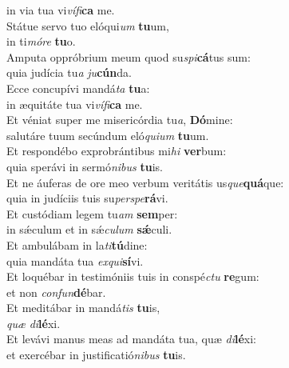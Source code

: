 \oddverse in via tua vi\textit{ví}\textit{fi}\textbf{ca} me.\\
\evenverse Státue servo tuo elóqui\textit{um} \textbf{tu}um,~\*\\
\evenverse in ti\textit{mó}\textit{re} \textbf{tu}o.\\
\oddverse Amputa oppróbrium meum quod su\textit{spi}\textbf{cá}tus sum:~\*\\
\oddverse quia judícia tu\textit{a} \textit{ju}\textbf{cún}da.\\
\evenverse Ecce concupívi mandá\textit{ta} \textbf{tu}a:~\*\\
\evenverse in æquitáte tua vi\textit{ví}\textit{fi}\textbf{ca} me.\\
\oddverse Et véniat super me misericórdia tu\textit{a}, \textbf{Dó}mine:~\*\\
\oddverse salutáre tuum secúndum eló\textit{qui}\textit{um} \textbf{tu}um.\\
\evenverse Et respondébo exprobrántibus mi\textit{hi} \textbf{ver}bum:~\*\\
\evenverse quia sperávi in sermó\textit{ni}\textit{bus} \textbf{tu}is.\\
\oddverse Et ne áuferas de ore meo verbum veritátis us\textit{que}\textbf{quá}que:~\*\\
\oddverse quia in judíciis tuis su\textit{per}\textit{spe}\textbf{rá}vi.\\
\evenverse Et custódiam legem tu\textit{am} \textbf{sem}per:~\*\\
\evenverse in sǽculum et in sǽ\textit{cu}\textit{lum} \textbf{sǽ}culi.\\
\oddverse Et ambulábam in la\textit{ti}\textbf{tú}dine:~\*\\
\oddverse quia mandáta tua \textit{ex}\textit{qui}\textbf{sí}vi.\\
\evenverse Et loquébar in testimóniis tuis in conspé\textit{ctu} \textbf{re}gum:~\*\\
\evenverse et non \textit{con}\textit{fun}\textbf{dé}bar.\\
\oddverse Et meditábar in mandá\textit{tis} \textbf{tu}is,~\*\\
\oddverse \textit{quæ} \textit{di}\textbf{lé}xi.\\
\evenverse Et levávi manus meas ad mandáta tua, quæ \textit{di}\textbf{lé}xi:~\*\\
\evenverse et exercébar in justificatió\textit{ni}\textit{bus} \textbf{tu}is.\\
